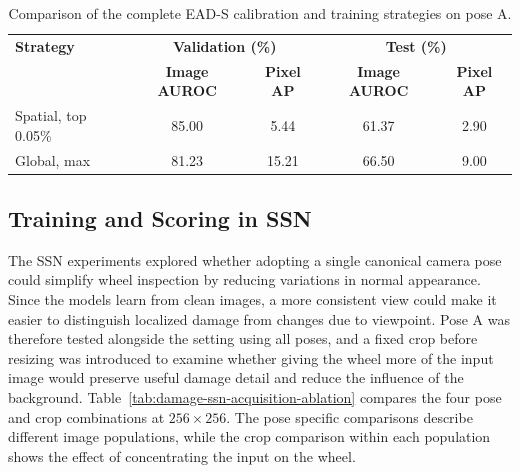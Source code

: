 \begin{table}[ht!]
    \centering
    \small
    \setlength{\tabcolsep}{4pt}
    \begin{tabular}{@{}l c c c c@{}}
        \toprule
        \textbf{Strategy}   & \multicolumn{2}{c}{\textbf{Validation (\%)}} & \multicolumn{2}{c}{\textbf{Test (\%)}}                                            \\
                            & \textbf{Image AUROC}                         & \textbf{Pixel AP}                      & \textbf{Image AUROC} & \textbf{Pixel AP} \\
        \midrule
        \midrule
        Spatial, top 0.05\% & 85.00                                        & 5.44                                   & 61.37                & 2.90              \\
        Global, max         & 81.23                                        & 15.21                                  & 66.50                & 9.00              \\
        \bottomrule
    \end{tabular}
    \vspace{5mm}
    \caption{Comparison of the complete EAD-S calibration and training strategies on pose A.}
    \label{tab:damage-efficientad-calibration-ablation}
\end{table}

\subsection{Training and Scoring in SSN}
\label{sec:damage-supersimplenet-ablation}

The SSN experiments explored whether adopting a single canonical camera pose could simplify wheel inspection by reducing variations in normal appearance. Since the models learn from clean images, a more consistent view could make it easier to distinguish localized damage from changes due to viewpoint. Pose A was therefore tested alongside the setting using all poses, and a fixed crop before resizing was introduced to examine whether giving the wheel more of the input image would preserve useful damage detail and reduce the influence of the background. Table~\ref{tab:damage-ssn-acquisition-ablation} compares the four pose and crop combinations at \(256\times256\). The pose specific comparisons describe different image populations, while the crop comparison within each population shows the effect of concentrating the input on the wheel.


